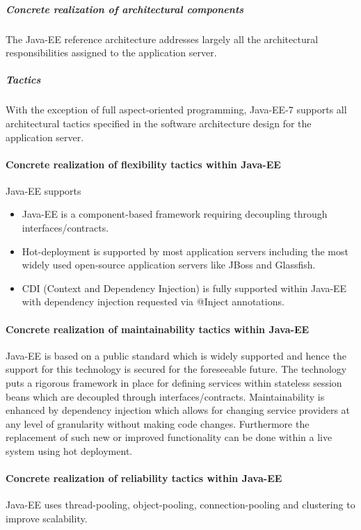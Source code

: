 \documentclass[a4paper,12pt]{report}
\begin{document}
				\subparagraph {Concrete realization of architectural components}
				\hfill \break
				The Java-EE reference architecture addresses largely all the architectural responsibilities assigned to the application server.
				
				\subparagraph {Tactics}
				\hfill \break
				With the exception of full aspect-oriented programming, Java-EE-7 supports all architectural tactics specified in the software architecture design for the application server.
				
			\paragraph {Concrete realization of flexibility tactics  within Java-EE}
			\hfill \break
			Java-EE supports
				\begin {itemize}
					\item Java-EE is a component-based framework requiring decoupling through interfaces/contracts.
					\item Hot-deployment is supported by most application servers including the most widely used
			open-source application servers like JBoss and Glassfish.
					\item CDI (Context and Dependency Injection) is fully supported within Java-EE with dependency
			injection requested via @Inject annotations.
				\end {itemize}
			\newpage
			\paragraph {Concrete realization of maintainability tactics  within Java-EE}
			Java-EE is based on a public standard which is widely supported and hence the support for this technology is secured for the foreseeable future. The technology puts a rigorous framework in place for defining services within stateless session beans which are decoupled through interfaces/contracts. Maintainability is enhanced by dependency injection which allows for changing service providers at any level of granularity without making code changes. Furthermore the replacement of such new
			or improved functionality can be done within a live system using hot deployment.
			
			\paragraph {Concrete realization of reliability tactics  within Java-EE}
			\hfill \break
			Java-EE uses thread-pooling, object-pooling, connection-pooling and clustering to improve scalability.
\end{document}
